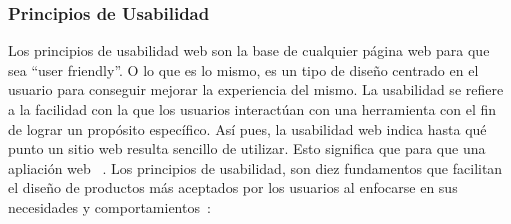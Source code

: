 \subsubsection{Principios de Usabilidad}
Los principios de usabilidad web son la base de cualquier página web para que sea “user friendly”. O lo que es lo mismo, es un tipo de diseño centrado en el usuario para conseguir mejorar la experiencia del mismo. La usabilidad se refiere a la facilidad con la que los usuarios interactúan con una herramienta con el fin de lograr un propósito específico. Así pues, la usabilidad web indica hasta qué punto un sitio web resulta sencillo de utilizar. Esto significa que para que una apliación web ~\cite{usabilidadJakob}. \newline
Los principios de usabilidad, son diez fundamentos que facilitan el diseño de productos más aceptados por los usuarios al enfocarse en sus necesidades y comportamientos~\cite{usabilidadJakob}:
